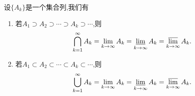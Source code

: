 \documentclass[../../main.tex]{subfiles}
\begin{document}
\begin{proposition}\label{proposition:单调集列的上下限集相等都等于其极限集}
设$\{A_k\}$是一个集合列,我们有
\begin{enumerate}
\item 若$A_1\supset A_2\supset \cdots\supset A_k\supset \cdots$,则
\begin{align*}
\bigcap_{k=1}^{\infty}A_k=\lim_{k\to \infty}A_k=\varliminf_{k\to \infty}A_k=\varlimsup_{k\to \infty}A_k.
\end{align*}

\item 若$A_1\subset A_2\subset \cdots\subset A_k\subset \cdots$,则
\begin{align*}
\bigcup_{k=1}^{\infty}A_k=\lim_{k\to \infty}A_k=\varliminf_{k\to \infty}A_k=\varlimsup_{k\to \infty}A_k.
\end{align*}
\end{enumerate}
\end{proposition}
\end{document}
